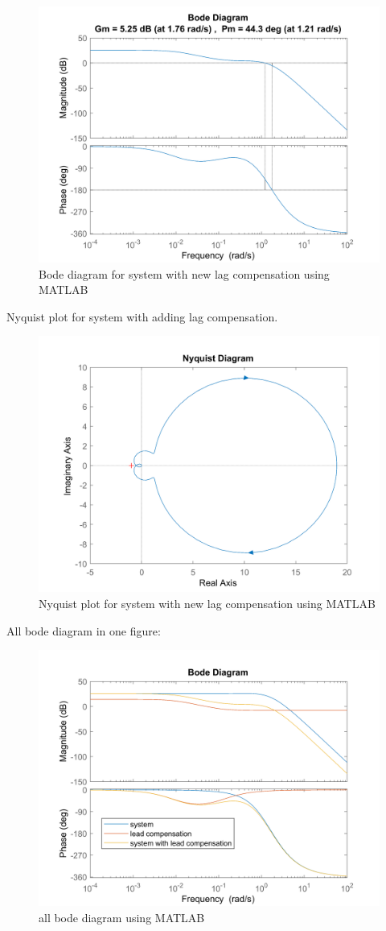 \begin{figure}[H]
	\caption{Bode diagram for system with new lag compensation using MATLAB}
	\centering
	\includegraphics[width=12cm]{../Figure/Q1/b/new2_margin.png}
\end{figure}
Nyquist plot for system with adding lag compensation.
\begin{figure}[H]
	\caption{Nyquist plot for system with new lag compensation using MATLAB}
	\centering
	\includegraphics[width=12cm]{../Figure/Q1/b/new2_nyquist.png}
\end{figure}
All bode diagram in one figure:
\begin{figure}[H]
	\caption{all bode diagram using MATLAB}
	\centering
	\includegraphics[width=12cm]{../Figure/Q1/b/new_all_in_one.png}
\end{figure}
